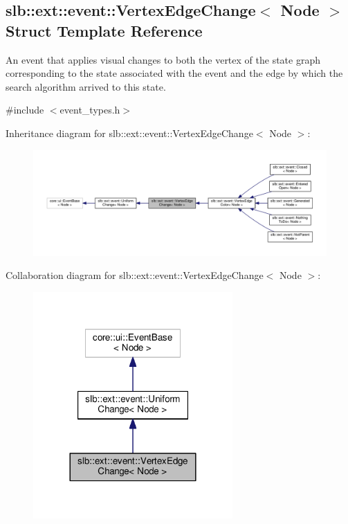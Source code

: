 \hypertarget{structslb_1_1ext_1_1event_1_1VertexEdgeChange}{}\subsection{slb\+:\+:ext\+:\+:event\+:\+:Vertex\+Edge\+Change$<$ Node $>$ Struct Template Reference}
\label{structslb_1_1ext_1_1event_1_1VertexEdgeChange}


An event that applies visual changes to both the vertex of the state graph corresponding to the state associated with the event and the edge by which the search algorithm arrived to this state.  




{\ttfamily \#include $<$event\+\_\+types.\+h$>$}



Inheritance diagram for slb\+:\+:ext\+:\+:event\+:\+:Vertex\+Edge\+Change$<$ Node $>$\+:\nopagebreak
\begin{figure}[H]
\begin{center}
\leavevmode
\includegraphics[width=350pt]{structslb_1_1ext_1_1event_1_1VertexEdgeChange__inherit__graph}
\end{center}
\end{figure}


Collaboration diagram for slb\+:\+:ext\+:\+:event\+:\+:Vertex\+Edge\+Change$<$ Node $>$\+:\nopagebreak
\begin{figure}[H]
\begin{center}
\leavevmode
\includegraphics[width=216pt]{structslb_1_1ext_1_1event_1_1VertexEdgeChange__coll__graph}
\end{center}
\end{figure}
